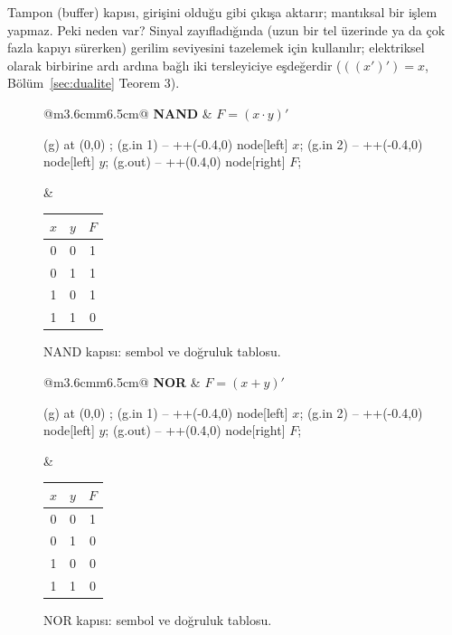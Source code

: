 \begin{bilginot}
Tampon (buffer) kapısı, girişini olduğu gibi çıkışa aktarır; mantıksal bir işlem yapmaz.
Peki neden var? Sinyal zayıfladığında (uzun bir tel üzerinde ya da çok fazla kapıyı
sürerken) gerilim seviyesini tazelemek için kullanılır; elektriksel olarak birbirine
ardı ardına bağlı iki tersleyiciye eşdeğerdir ($((x')')=x$, Bölüm~\ref{sec:dualite} Teorem 3).
\end{bilginot}

\begin{figure}[H]
\centering
\begin{tabular}{@{}m{3.6cm}m{6.5cm}@{}}
\textbf{NAND} &
$F=(x\cdot y)'$ \\
\begin{circuitikz}[scale=0.8]
\node[nand port, line width=0.4pt] (g) at (0,0) {};
\draw (g.in 1) -- ++(-0.4,0) node[left] {$x$};
\draw (g.in 2) -- ++(-0.4,0) node[left] {$y$};
\draw (g.out) -- ++(0.4,0) node[right] {$F$};
\end{circuitikz}
&
\begin{tabular}{cc|c}
\toprule
$x$&$y$&$F$\\
\midrule
0&0&1\\0&1&1\\1&0&1\\1&1&0\\
\bottomrule
\end{tabular}
\end{tabular}
\caption{NAND kapısı: sembol ve doğruluk tablosu.}
\label{fig:kapi-nand}
\end{figure}

\begin{figure}[H]
\centering
\begin{tabular}{@{}m{3.6cm}m{6.5cm}@{}}
\textbf{NOR} &
$F=(x+y)'$ \\
\begin{circuitikz}[scale=0.8]
 (g) at (0,0) {};
\draw (g.in 1) -- ++(-0.4,0) node[left] {$x$};
\draw (g.in 2) -- ++(-0.4,0) node[left] {$y$};
\draw (g.out) -- ++(0.4,0) node[right] {$F$};
\end{circuitikz}
&
\begin{tabular}{cc|c}
\toprule
$x$&$y$&$F$\\
\midrule
0&0&1\\0&1&0\\1&0&0\\1&1&0\\
\bottomrule
\end{tabular}
\end{tabular}
\caption{NOR kapısı: sembol ve doğruluk tablosu.}
\label{fig:kapi-nor}
\end{figure}

